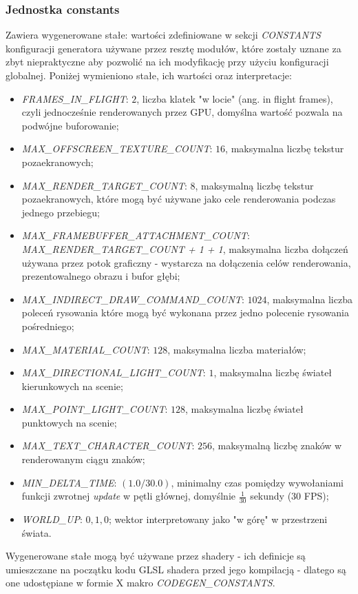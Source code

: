 \subsubsection{Jednostka constants}
Zawiera wygenerowane stałe: wartości zdefiniowane w sekcji \textit{CONSTANTS} konfiguracji generatora używane przez resztę modułów, które zostały uznane za zbyt niepraktyczne aby pozwolić na ich modyfikację przy użyciu konfiguracji globalnej.
Poniżej wymieniono stałe, ich wartości oraz interpretacje:
\begin{itemize}
	\item \textit{FRAMES\_IN\_FLIGHT}: $2$, liczba klatek "w locie" (ang. in flight frames), czyli jednocześnie renderowanych przez GPU, domyślna wartość pozwala na podwójne buforowanie; 
	\item \textit{MAX\_OFFSCREEN\_TEXTURE\_COUNT}: $16$, maksymalna liczbę tekstur pozaekranowych;
	\item \textit{MAX\_RENDER\_TARGET\_COUNT}: $8$, maksymalną liczbę tekstur pozaekranowych, które mogą być używane jako cele renderowania podczas jednego przebiegu; 
	\item \textit{MAX\_FRAMEBUFFER\_ATTACHMENT\_COUNT}: \textit{MAX\_RENDER\_TARGET\_COUNT + 1 + 1}, maksymalna liczba dołączeń używana przez potok graficzny - wystarcza na dołączenia celów renderowania, prezentowalnego obrazu i bufor głębi;
	\item \textit{MAX\_INDIRECT\_DRAW\_COMMAND\_COUNT}: $1024$, maksymalna liczba poleceń rysowania które mogą być wykonana przez jedno polecenie rysowania pośredniego;
	\item \textit{MAX\_MATERIAL\_COUNT}: $128$, maksymalna liczba materiałów;
	\item \textit{MAX\_DIRECTIONAL\_LIGHT\_COUNT}: $1$, maksymalna liczbę świateł kierunkowych na scenie;
	\item \textit{MAX\_POINT\_LIGHT\_COUNT}: $128$, maksymalna liczbę świateł punktowych na scenie;
	\item \textit{MAX\_TEXT\_CHARACTER\_COUNT}: $256$, maksymalną liczbę znaków w renderowanym ciągu znaków;
	\item \textit{MIN\_DELTA\_TIME}: $(1.0 / 30.0)$, minimalny czas pomiędzy wywołaniami funkcji zwrotnej \textit{update} w pętli głównej, domyślnie $\frac{1}{30}$ sekundy (30 FPS);
	\item \textit{WORLD\_UP}: $0, 1, 0$; wektor interpretowany jako "w górę" w przestrzeni świata.
\end{itemize}

Wygenerowane stałe mogą być używane przez shadery - ich definicje są umieszczane na początku kodu GLSL shadera przed jego kompilacją - dlatego są one udostępiane w formie X makro \textit{CODEGEN\_CONSTANTS}.

